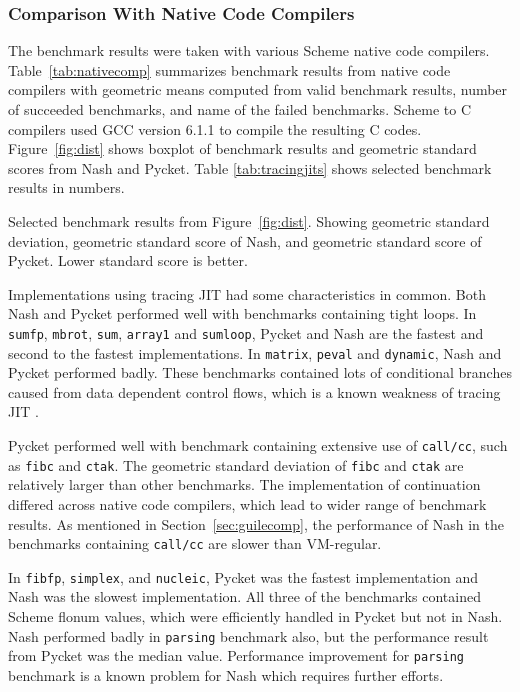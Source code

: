 \documentclass[preprint, 10pt]{sigplanconf}
\begin{document}
\subsubsection{Comparison With Native Code Compilers}

The benchmark results were taken with various Scheme native code compilers.
Table~\hyperref[tab:impls]{\ref{tab:nativecomp}} summarizes benchmark results
from native code compilers with geometric means computed from valid benchmark
results, number of succeeded benchmarks, and name of the failed
benchmarks. Scheme to C compilers used GCC version 6.1.1 to compile the
resulting C codes. Figure~\hyperref[fig:dist]{\ref{fig:dist}} shows boxplot of
benchmark results and geometric standard scores from Nash and Pycket. Table
\hyperref[tab:tracingjits]{\ref{tab:tracingjits}} shows selected benchmark
results in numbers.

\begin{table}
  \centering
  
  \caption{Selected benchmark results from
    Figure~\hyperref[fig:dist]{\ref{fig:dist}}. Showing geometric standard
    deviation, geometric standard score of Nash, and geometric standard score
    of Pycket. Lower standard score is better.}
\label{tab:tracingjits}
\end{table}

Implementations using tracing JIT had some characteristics in common. Both
Nash and Pycket performed well with benchmarks containing tight loops. In
\texttt{sumfp}, \texttt{mbrot}, \texttt{sum}, \texttt{array1} and
\texttt{sumloop}, Pycket and Nash are the fastest and second to the fastest
implementations.  In \texttt{matrix}, \texttt{peval} and \texttt{dynamic},
Nash and Pycket performed badly. These benchmarks contained lots of
conditional branches caused from data dependent control flows, which is a
known weakness of tracing JIT \citep{bauman2015pycket}.

Pycket performed well with benchmark containing extensive use of
\texttt{call/cc}, such as \texttt{fibc} and \texttt{ctak}. The geometric
standard deviation of \texttt{fibc} and \texttt{ctak} are relatively larger
than other benchmarks. The implementation of continuation differed across
native code compilers, which lead to wider range of benchmark results. As
mentioned in Section~\ref{sec:guilecomp}, the performance of Nash in the
benchmarks containing \texttt{call/cc} are slower than VM-regular.

In \texttt{fibfp}, \texttt{simplex}, and \texttt{nucleic}, Pycket was the
fastest implementation and Nash was the slowest implementation. All three of
the benchmarks contained Scheme flonum values, which were efficiently handled
in Pycket but not in Nash.  Nash performed badly in \texttt{parsing} benchmark
also, but the performance result from Pycket was the median value. Performance
improvement for \texttt{parsing} benchmark is a known problem for Nash which
requires further efforts.
\end{document}
